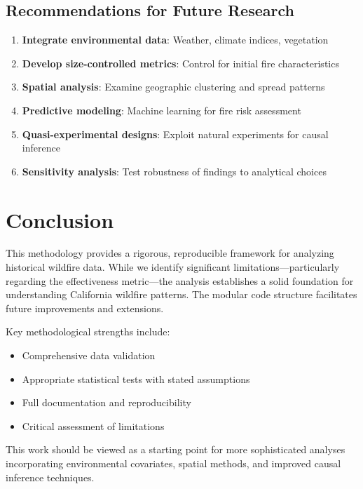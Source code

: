 \documentclass[12pt,a4paper]{article}
\begin{document}
\subsection{Recommendations for Future Research}

\begin{enumerate}
    \item \textbf{Integrate environmental data}: Weather, climate indices, vegetation
    \item \textbf{Develop size-controlled metrics}: Control for initial fire characteristics
    \item \textbf{Spatial analysis}: Examine geographic clustering and spread patterns
    \item \textbf{Predictive modeling}: Machine learning for fire risk assessment
    \item \textbf{Quasi-experimental designs}: Exploit natural experiments for causal inference
    \item \textbf{Sensitivity analysis}: Test robustness of findings to analytical choices
\end{enumerate}

\section{Conclusion}

This methodology provides a rigorous, reproducible framework for analyzing historical wildfire data. While we identify significant limitations—particularly regarding the effectiveness metric—the analysis establishes a solid foundation for understanding California wildfire patterns. The modular code structure facilitates future improvements and extensions.

Key methodological strengths include:
\begin{itemize}
    \item Comprehensive data validation
    \item Appropriate statistical tests with stated assumptions
    \item Full documentation and reproducibility
    \item Critical assessment of limitations
\end{itemize}

This work should be viewed as a starting point for more sophisticated analyses incorporating environmental covariates, spatial methods, and improved causal inference techniques.
\end{document}
